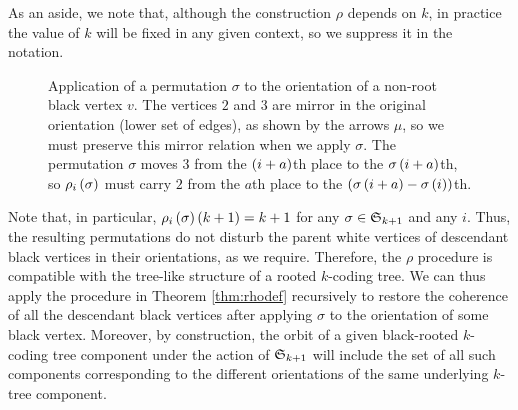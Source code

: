 \documentclass[sectionflow,singlespace,twoside,boldmathhdr,draft]{brandiss} %
\numberwithin{section}{chapter}
\numberwithin{figure}{chapter}
\begin{document}
As an aside, we note that, although the construction $\rho$ depends on $k$, in practice the value of $k$ will be fixed in any given context, so we suppress it in the notation.

\begin{figure}[htbp]
  \centering
  \caption[The permutation-modifying map $\rho$]{Application of a permutation $\sigma$ to the orientation of a non-root black vertex $v$.
    The vertices $2$ and $3$ are mirror in the original orientation (lower set of edges), as shown by the arrows $\mu$, so we must preserve this mirror relation when we apply $\sigma$.
    The permutation $\sigma$ moves $3$ from the $\left( {i+a} \right)$th place to the $\sigma \left( {i+a} \right)$th, so $\rho_{i} \left( {\sigma} \right)$ must carry $2$ from the $a$th place to the $\left( {\sigma \left( {i+a} \right) - \sigma \left( {i} \right)} \right)$th.}
  \label{fig:rhoapp}
\end{figure}

Note that, in particular, $\rho_{i} \left( {\sigma} \right) \left( {k+1} \right) = k+1$ for any $\sigma \in  \mathfrak{S}_{k+1} $ and any $i$.
Thus, the resulting permutations do not disturb the parent white vertices of descendant black vertices in their orientations, as we require.
Therefore, the $\rho$ procedure is compatible with the tree-like structure of a rooted $k$-coding tree.
We can thus apply the procedure in Theorem \ref{thm:rhodef} recursively to restore the coherence of all the descendant black vertices after applying $\sigma$ to the orientation of some black vertex.
Moreover, by construction, the orbit of a given black-rooted $k$-coding tree component under the action of $ \mathfrak{S}_{k+1} $ will include the set of all such components corresponding to the different orientations of the same underlying $k$-tree component.
\end{document}
